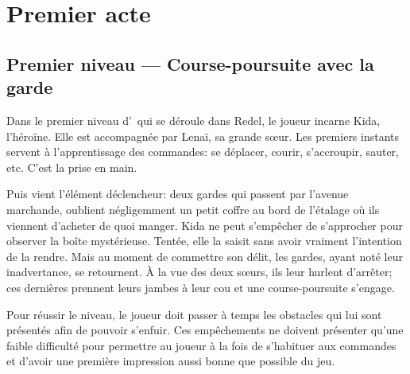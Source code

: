 
\printMiniToc




\section{Premier acte}
\label{sec:premierActe}

\subsection[Niveau 1 --- Course-poursuite avec la garde]{Premier niveau --- Course-poursuite avec la garde}
\label{sec:coursepoursuiteGarde}

Dans le premier niveau d'\nomJeu\ qui se déroule dans Redel, le joueur incarne Kida, l'héroïne. Elle est accompagnée par Lenaï, sa grande s\oe ur. Les premiers instants servent à l'apprentissage des commandes: se déplacer, courir, s'accroupir, sauter, etc. C'est la prise en main.

Puis vient l'élément déclencheur: deux gardes qui passent par l'avenue marchande, oublient négligemment un petit coffre au bord de l'étalage où ils viennent d'acheter de quoi manger. Kida ne peut s'empêcher de s'approcher pour observer la boîte mystérieuse. Tentée, elle la saisit sans avoir vraiment l'intention de la rendre. Mais au moment de commettre son délit, les gardes, ayant noté leur inadvertance, se retournent. À la vue des deux s\oe urs, ils leur hurlent d'arrêter; ces dernières prennent leurs jambes à leur cou et une course-poursuite s'engage.

Pour réussir le niveau, le joueur doit passer à temps les obstacles qui lui sont présentés afin de pouvoir s'enfuir. Ces empêchements ne doivent présenter qu'une faible difficulté pour permettre au joueur à la fois de s'habituer aux commandes et d'avoir une première impression aussi bonne que possible du jeu.

